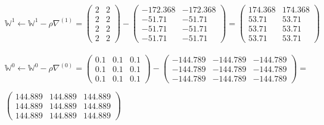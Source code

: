 \documentclass[12pt]{article}
\begin{document}
\indent $\mathbb{W}^{1} \leftarrow \mathbb{W}^{1} - \rho\nabla^{(1)} = 
\begin{pmatrix}
2 & 2 \\
2 & 2 \\
2 & 2 \\
2 & 2 
\end{pmatrix} - 
\begin{pmatrix}
-172.368 & -172.368 \\
-51.71 & -51.71 \\
-51.71 & -51.71 \\
-51.71 & -51.71 
\end{pmatrix} = 
\begin{pmatrix}
174.368 & 174.368 \\
53.71 & 53.71 \\
53.71 & 53.71 \\
53.71 & 53.71 
\end{pmatrix}
$\\\\

\indent $\mathbb{W}^{0} \leftarrow \mathbb{W}^{0} - \rho\nabla^{(0)} = 
\begin{pmatrix}
0.1 & 0.1 & 0.1\\
0.1 & 0.1 & 0.1\\
0.1 & 0.1 & 0.1
\end{pmatrix} - 
\begin{pmatrix}
-144.789 & -144.789 & -144.789 \\
-144.789 & -144.789 & -144.789 \\
-144.789 & -144.789 & -144.789 
\end{pmatrix} = $\\
\begin{center}$
\begin{pmatrix}
144.889 & 144.889 & 144.889 \\
144.889 & 144.889 & 144.889 \\
144.889 & 144.889 & 144.889 
\end{pmatrix}$
\end{center}


\noindent \hrulefill \\




\end{document}
